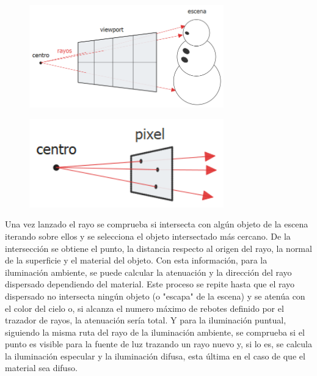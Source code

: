 \documentclass[10pt, a4paper]{article}
\begin{document}
\begin{figure}[h]
     \centering 
    \includegraphics[width=0.75\textwidth]{camera_rays}

\end{figure}

    \caption{Diagrama del funcionamiento de la cámara en el algoritmo de trazado de rayos. Los rayos comienzan en el centro de la cámara en dirección al centro de cada pixel del viewport.}


\begin{figure}[h]
     \centering 
    \includegraphics[width=0.75\textwidth]{camera_samples}

\end{figure}

    \caption{Diagrama del muestreo aleatorio realizado a nivel de píxel. Utilizado para reducir el aliasing y aumentar la calidad.}

Una vez lanzado el rayo se comprueba si intersecta con algún objeto de la escena iterando sobre ellos y se selecciona el objeto intersectado más cercano. De la intersección se obtiene el punto, la distancia respecto al origen del rayo, la normal de la superficie y el material del objeto. Con esta información, para la iluminación ambiente, se puede calcular la atenuación y la dirección del rayo dispersado dependiendo del material. Este proceso se repite hasta que el rayo dispersado no intersecta ningún objeto (o "escapa" de la escena) y se atenúa con el color del cielo o, si alcanza el numero máximo de rebotes definido por el trazador de rayos, la atenuación sería total. Y para la iluminación puntual, siguiendo la misma ruta del rayo de la iluminación ambiente, se comprueba si el punto es visible para la fuente de luz trazando un rayo nuevo y, si lo es, se calcula la iluminación especular y la iluminación difusa, esta última en el caso de que el material sea difuso. 
\end{document}
